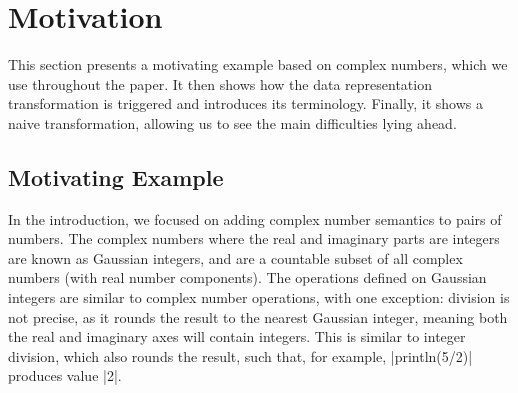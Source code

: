 \section{Motivation}
\label{sec:problem}

This section presents a motivating example based on complex numbers, which we use throughout the paper. It then shows how the data representation transformation is triggered and introduces its terminology. Finally, it shows a naive transformation, allowing us to see the main difficulties lying ahead.

\subsection{Motivating Example}

In the introduction, we focused on adding complex number semantics to pairs of numbers. The complex numbers where the real and imaginary parts are integers are known as Gaussian integers, and are a countable subset of all complex numbers (with real number components). The operations defined on Gaussian integers are similar to complex number operations, with one exception: division is not precise, as it rounds the result to the nearest Gaussian integer, meaning both the real and imaginary axes will contain integers. This is similar to integer division, which also rounds the result, such that, for example, |println(5/2)| produces value |2|.


